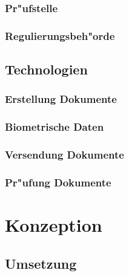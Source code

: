 \documentclass[a4paper, 12pt]{article}
\begin{document}
\subsubsection{Pr"ufstelle}
\label{sec:Pr"ufstelle}


\subsubsection{Regulierungsbeh"orde}
\label{sec:Regulierungsbeh"orde}


\subsection{Technologien}
\label{sec:Technologien}


\subsubsection{Erstellung Dokumente}
\label{sec:Erstellung Dokumente}


\subsubsection{Biometrische Daten}
\label{sec:Biometrische Daten}


\subsubsection{Versendung Dokumente}
\label{sec:Versendung Dokumente}


\subsubsection{Pr"ufung Dokumente}
\label{sec:Pr"ufung Dokumente}

\section{Konzeption}
\label{sec:Konzeption}


\subsection{Umsetzung}
\label{sec:Umsetzung}

\end{document}
